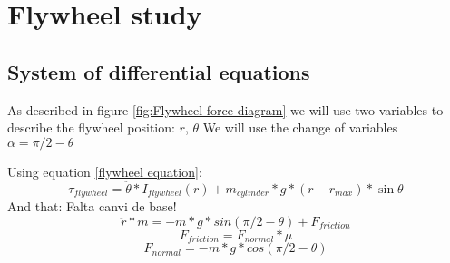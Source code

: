 \section{Flywheel study}

\subsection{System of differential equations}
As described in figure \ref{fig:Flywheel force diagram} we will use two variables to describe the flywheel position: $r$, $\theta$ 
We will use the change of variables $\alpha =\pi/2 - \theta$

Using equation \ref{flywheel equation}:
\[\tau_{flywheel} = \ddot{\theta}*I_{flywheel}(r) + m_{cylinder} * g * (r - r_{max}) * \sin{\theta}\]
And that:
Falta canvi de base!
\[\ddot{r} * m = -m * g * sin(\pi/2-\theta) + F_{friction}\]
\[F_{friction} = F_{normal} * \mu\]
\[F_{normal} = -m * g * cos(\pi/2-\theta)\]